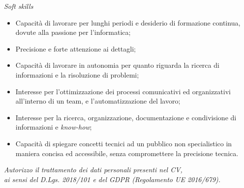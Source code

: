 \documentclass[12pt]{article}
\begin{document}
{\Large \textit{Soft skills}}

\begin{itemize}
\item Capacità di lavorare per lunghi periodi e desiderio di formazione continua, dovute alla passione per l'informatica;
\item Precisione e forte attenzione ai dettagli;
\item Capacità di lavorare in autonomia per quanto riguarda la ricerca di informazioni e la risoluzione di problemi;
\item Interesse per l'ottimizzazione dei processi comunicativi ed organizzativi all'interno di un team, e l'automatizzazione del lavoro;
\item Interesse per la ricerca, organizzazione, documentazione e condivisione di informazioni e \textit{know-how};
\item Capacità di spiegare concetti tecnici ad un pubblico non specialistico in maniera concisa ed accessibile, senza compromettere la precisione tecnica.
\end{itemize}

\begin{center}
\textit{Autorizzo il trattamento dei dati personali presenti nel CV,\\ai sensi del D.Lgs. 2018/101 e del GDPR (Regolamento UE 2016/679).}
\end{center}
\end{document}
